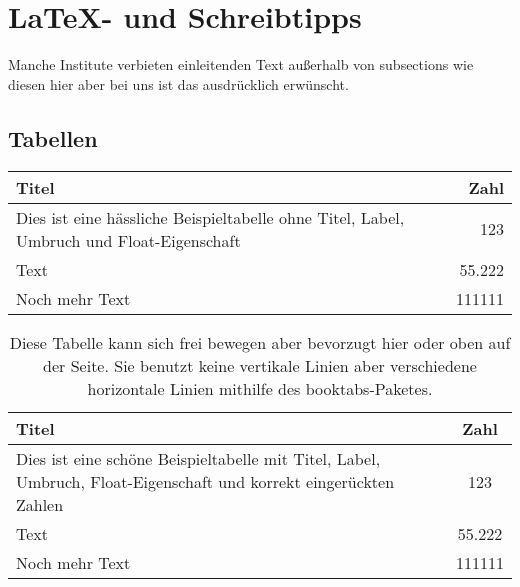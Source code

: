 \chapter{\LaTeX{}- und Schreibtipps}
Manche Institute verbieten einleitenden Text außerhalb von subsections wie diesen hier aber bei uns ist das ausdrücklich erwünscht.

\section{Tabellen}

\begin{tabular}{|l|r|}
\hline
Titel									&Zahl\\
\hline
Dies ist eine hässliche Beispieltabelle	ohne Titel, Label, Umbruch und Float-Eigenschaft &123\\
Text									&55.222\\
Noch mehr Text							&111111\\
\hline
\end{tabular}

\begin{table}[ht]
\begin{tabulary}{\textwidth}{LS}
\toprule
Titel									&Zahl\\
\midrule
Dies ist eine schöne Beispieltabelle mit Titel, Label, Umbruch, Float-Eigenschaft und korrekt eingerückten Zahlen	&123\\
Text																												&55.222\\
Noch mehr Text																										&111111\\
\bottomrule
\end{tabulary}
\caption{Diese Tabelle kann sich frei bewegen aber bevorzugt hier oder oben auf der Seite. Sie benutzt keine vertikale Linien aber verschiedene horizontale Linien mithilfe des booktabs-Paketes.}
\label{tab:exampletable}
\end{table}


